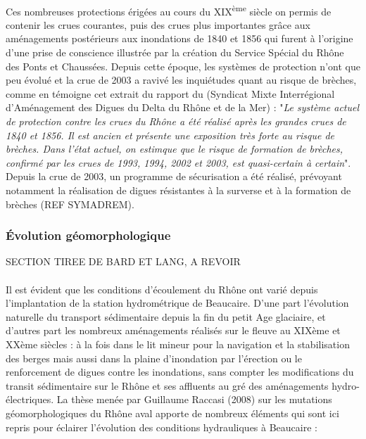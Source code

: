 \documentclass[11pt]{article}
\begin{document}
		\paragraph{} Ces nombreuses protections érigées au cours du XIX\textsuperscript{ème} siècle on permis de contenir les crues courantes, puis des crues plus importantes grâce aux aménagements postérieurs aux inondations de 1840 et 1856 qui furent à l'origine d'une prise de conscience illustrée par la création du Service Spécial du Rhône des Ponts et Chaussées. Depuis cette époque, les systèmes de protection n'ont que peu évolué et la crue de 2003 a ravivé les inquiétudes quant au risque de brèches, comme en témoigne cet extrait du rapport du \citet{symadrem_programme_2012} (Syndicat Mixte Interrégional d'Aménagement des Digues du Delta du Rhône et de la Mer) : "\textit{Le système actuel de protection contre les crues du Rhône a été réalisé après les grandes crues de 1840 et 1856. Il est ancien et présente une exposition très forte au risque de brèches. Dans l'état actuel, on estimque que le risque de formation de brèches, confirmé par les crues de 1993, 1994, 2002 et 2003, est quasi-certain à certain}". Depuis la crue de 2003, un programme de sécurisation a été réalisé, prévoyant notamment la réalisation de digues résistantes à la surverse et à la formation de brèches (REF SYMADREM).    
		
		\subsubsection{Évolution géomorphologique}
		
		SECTION TIREE DE BARD ET LANG, A REVOIR
		
		\paragraph{} Il est évident que les conditions d’écoulement du Rhône ont varié depuis l’implantation de la station hydrométrique de Beaucaire. D’une part l’évolution naturelle du transport sédimentaire depuis la fin du petit Age glaciaire, et d’autres part les nombreux aménagements réalisés sur le fleuve au XIXème et XXème siècles : à la fois dans le lit mineur pour la navigation et la stabilisation des berges mais aussi dans la plaine d’inondation par l’érection ou le renforcement de digues contre les inondations, sans compter les modifications du transit sédimentaire sur le Rhône et ses affluents au gré des aménagements hydro-électriques.
La thèse menée par Guillaume Raccasi (2008) sur les mutations géomorphologiques du Rhône aval apporte de nombreux éléments qui sont ici repris pour éclairer l’évolution des conditions hydrauliques à Beaucaire :
\end{document}
